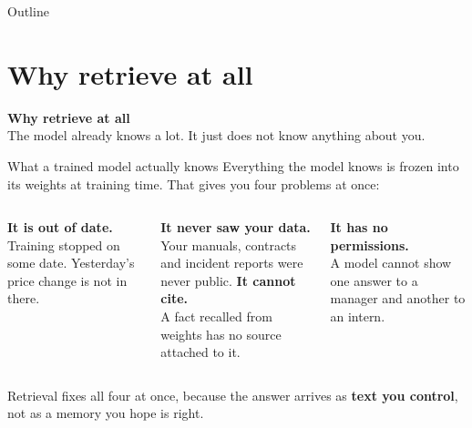\documentclass[aspectratio=169]{beamer}
\newcommand{\takebox}[1]{%
  \begin{tcolorbox}[colback=paramgreen!8, colframe=paramgreen, boxrule=0.6pt, arc=2pt]
  #1
  \end{tcolorbox}}
\newcommand{\sectiontransition}[2]{%
  \begin{frame}[plain]
    \vfill
    \begin{center}
      {\Huge\bfseries\color{popblue} #1}\\[1.1em]
      {\large #2}
    \end{center}
    \vfill
  \end{frame}}
\begin{document}
\begin{frame}{Outline}
  \tableofcontents
\end{frame}

\section{Why retrieve at all}
\sectiontransition{Why retrieve at all}{The model already knows a lot. It just does not know
anything about you.}

\begin{frame}{What a trained model actually knows}
  \vspace{0.5em}
  Everything the model knows is frozen into its weights at training time. That gives you
  four problems at once:

  \vspace{0.8em}
  \begin{columns}[T]
      \textbf{\color{armred}It is out of date.}\\
      {\small Training stopped on some date. Yesterday's price change is not in there.}

      \vspace{0.9em}
      \textbf{\color{armred}It never saw your data.}\\
      {\small Your manuals, contracts and incident reports were never public.}
      \textbf{\color{armred}It cannot cite.}\\
      {\small A fact recalled from weights has no source attached to it.}

      \vspace{0.9em}
      \textbf{\color{armred}It has no permissions.}\\
      {\small A model cannot show one answer to a manager and another to an intern.}
  \end{columns}

  \vspace{1.0em}
  \takebox{Retrieval fixes all four at once, because the answer arrives as \textbf{text you
  control}, not as a memory you hope is right.}
\end{frame}
\end{document}

